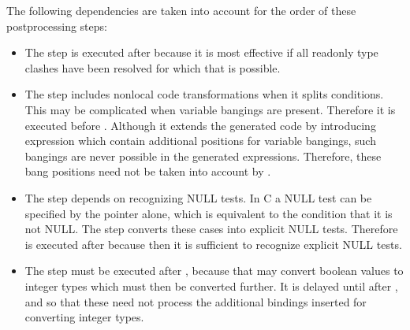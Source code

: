 The following dependencies are taken into account for the order of these postprocessing steps:
\begin{itemize}
\item The  step is executed after  because it is most effective if all readonly type clashes
have been resolved for which that is possible.
\item The  step includes nonlocal code transformations when it splits conditions. This may be complicated when
variable bangings are present. Therefore it is executed before . Although it extends the generated code by introducing
 expression which contain additional positions for variable bangings, such bangings are never possible in the generated
 expressions. Therefore, these bang positions need not be taken into account by .
\item The  step depends on recognizing NULL tests. In C a NULL test can be specified by the pointer alone, which
is equivalent to the condition that it is not NULL. The  step converts these cases into explicit NULL tests. Therefore
 is executed after  because then it is sufficient to recognize explicit NULL tests.
\item The  step must be executed after , because that may convert boolean values to integer types
which must then be converted further. It is delayed until after ,  and  so
that these need not process the additional bindings inserted for converting integer types.
\end{itemize}

